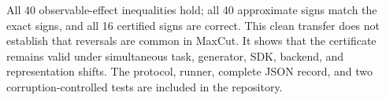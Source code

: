 \documentclass[10pt]{article}
\begin{document}
All 40 observable-effect inequalities hold; all 40 approximate signs match
the exact signs, and all 16 certified signs are correct. This clean transfer
does not establish that reversals are common in MaxCut. It shows that the
certificate remains valid under simultaneous task, generator, SDK, backend,
and representation shifts. The protocol, runner, complete JSON record, and
two corruption-controlled tests are included in the repository.
\end{document}
